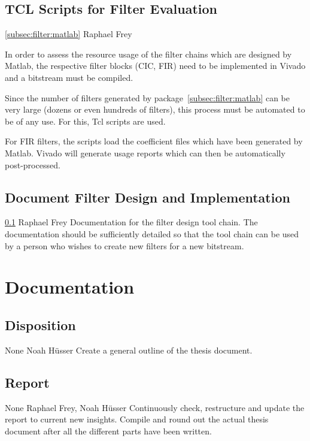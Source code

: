 \documentclass[a4paper,oneside]{alpenspecs/alpenspecs}
\begin{document}
\subsection{TCL Scripts for Filter Evaluation}
\label{subsec:filter:tcl}

\wpac
    {}
    {}
    {}
    {\ref{subsec:filter:matlab}}
    {}
    {Raphael Frey}
    {%
    In  order to  assess the  resource usage  of the  filter chains  which are
    designed by  Matlab, the respective  filter blocks  (CIC, FIR) need  to be
    implemented in Vivado and a bitstream must be compiled.

    Since       the      number       of       filters      generated       by
    package~\ref{subsec:filter:matlab}  can  be  very large  (dozens  or  even
    hundreds of filters), this process must be automated to be of any use. For
    this, Tcl scripts are used.

    For FIR  filters, the scripts load  the coefficient files which  have been
    generated by Matlab.  Vivado will generate usage reports which can then be
    automatically post-processed.
    }


\subsection{Document Filter Design and Implementation}
\label{subsec:filter:doc}

\wpac
    {}
    {}
    {}
    {\ref{subsec:filter:tcl}}
    {}
    {Raphael Frey}
    {%
        Documentation  for the  filter  design  tool chain. The  documentation
        should be sufficiently detailed so that  the tool chain can be used by
        a person who wishes to create new filters for a new bitstream.
    }


\section{Documentation}
\label{sec:docs}

\subsection{Disposition}
\wpac
    {}
    {}
    {}
    {None}
    {}
    {Noah H\"usser}
    {%
    Create a general outline of the thesis document.%
    }

\subsection{Report}
\wpac
    {}
    {}
    {}
    {None}
    {}
    {Raphael Frey, Noah H\"usser}
    {%
    Continuously  check, restructure  and  update the  report  to current  new
    insights.  Compile and round out the  actual thesis document after all the
    different parts have been written.%
    }
\end{document}
